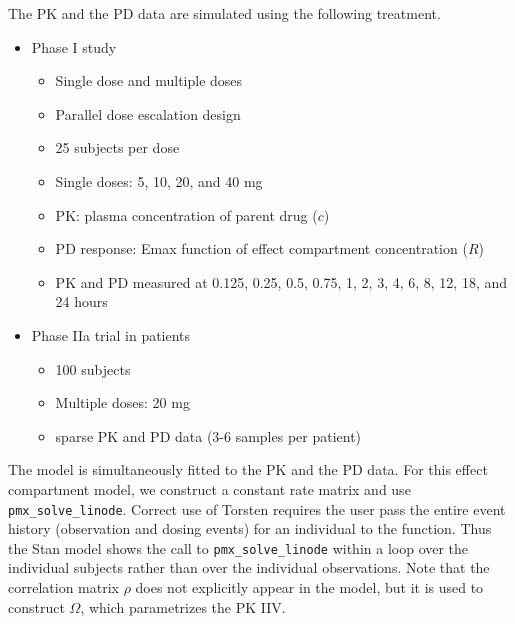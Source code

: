 \documentclass[12pt, reqno, oneside]{amsbook}
\numberwithin{equation}{chapter}
\numberwithin{figure}{chapter}
\numberwithin{table}{chapter}
\theoremstyle{remark}
\begin{document}
The PK and the PD data are simulated using the following
treatment.
\begin{itemize}
\item Phase I study
\begin{itemize}
\item Single dose and multiple doses
\item Parallel dose escalation design
\item 25 subjects per dose
\item Single doses: 5, 10, 20, and 40 mg
\item PK: plasma concentration of parent drug (\(c\))
\item PD response: Emax function of effect compartment concentration (\(R\))
\item PK and PD measured at 0.125, 0.25, 0.5, 0.75, 1, 2, 3, 4, 6, 8, 12, 18, and 24 hours
\end{itemize}
\item Phase IIa trial in patients
\begin{itemize}
\item 100 subjects
\item Multiple doses: 20 mg
\item sparse PK and PD data (3-6 samples per patient)
\end{itemize}
\end{itemize}

The model is simultaneously fitted to the PK and the PD
data. For this effect compartment model, we construct a
constant rate matrix and use \texttt{pmx\_solve\_linode}. Correct use of
Torsten requires the user pass the entire event history
(observation and dosing events) for an individual to the
function. Thus the Stan model shows the call to \texttt{pmx\_solve\_linode}
within a loop over the individual subjects rather than over
the individual observations. Note that the correlation matrix \(\rho\) does not explicitly appear
in the model, but it is used to construct \(\Omega\), which parametrizes
the PK IIV.
\end{document}
